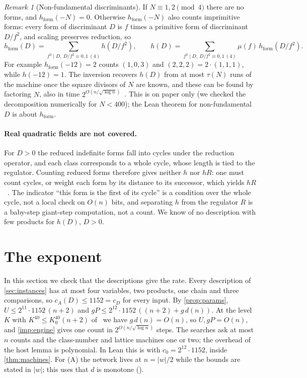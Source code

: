 \documentclass[10pt]{amsart}
\theoremstyle{plain}
\theoremstyle{definition}
\theoremstyle{remark}
\newtheorem{remark}[theorem]{Remark}
\numberwithin{equation}{section}
\newcommand{\hF}{h_{\mathrm{form}}}
\newcommand{\rate}{2^{O(n/\sqrt{\log n})}}
\begin{document}
\begin{remark}[Non-fundamental discriminants]\label{rem:nonfund}
If $N\equiv1,2\pmod4$ there are no forms, and $\hF(-N)=0$. Otherwise $\hF(-N)$ also counts imprimitive forms:
every form of discriminant $D$ is $f$ times a primitive form of discriminant $D/f^2$, and scaling preserves
reduction, so
\[
  \hF(D)=\sum_{f^2\mid D,\ D/f^2\equiv0,1\ (4)}h(D/f^2),\qquad
  h(D)=\sum_{f^2\mid D,\ D/f^2\equiv0,1\ (4)}\mu(f)\,\hF(D/f^2).
\]
For example $\hF(-12)=2$ counts $(1,0,3)$ and $(2,2,2)=2\cdot(1,1,1)$, while $h(-12)=1$. The inversion
recovers $h(D)$ from at most $\tau(N)$ runs of the machine once the square divisors of $N$ are known, and
these can be found by factoring $N$, also in time $\rate$~\cite{TulFac26}. This is on paper only (we checked
the decomposition numerically for $N<400$); the Lean theorem for non-fundamental $D$ is about $\hF$.
\end{remark}

\paragraph{Real quadratic fields are not covered.} For $D>0$ the reduced indefinite forms fall into
cycles under the reduction operator, and each class corresponds to a whole cycle, whose length is tied
to the regulator. Counting reduced forms therefore gives neither $h$ nor $hR$: one must count cycles, or
weight each form by its distance to its successor, which yields $hR$~\cite[\S4--5]{Sch82}. The
indicator ``this form is the first of its cycle'' is a condition over the whole cycle, not a local check
on $O(n)$ bits, and separating $h$ from the regulator $R$ is a baby-step giant-step computation, not a
count. We know of no description with few products for $h(D)$, $D>0$.

\section{The exponent}\label{sec:rate}

In this section we check that the descriptions give the rate. Every description of \cref{sec:instances}
has at most four variables, two products, one chain and three comparisons, so $c_A(D)\le1152=c_D$ for every
input. By \cref{prop:params}, $U\le2^{11}\cdot1152\,(n+2)$ and $gP\le2^{12}\cdot1152\,((n+2)+g\,d(n))$. At
the level $K$ with $K^{40}\le K_0^{40}(n+2)$ of~\cite[\S5]{TulFac26} we have $g\,d(n)=O(n)$, so $U,gP=O(n)$,
and \cref{imp:engine} gives one count in $2^{O(n/\sqrt{\log n})}$ steps. The searches ask at most $n$
counts and the class-number and lattice machines one or two; the overhead of the host lemma is
polynomial. In Lean this is  with $c_0=2^{12}\cdot1152$, inside
\cref{thm:machines}. For (A) the network lives at $n=|w|/2$ while the bounds are stated in $|w|$; this
uses that $d$ is monotone ().
\end{document}

